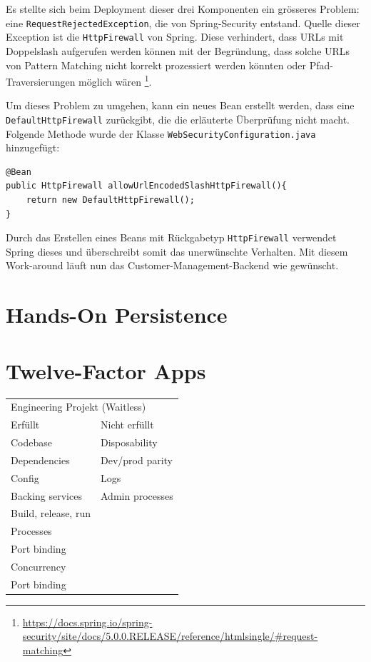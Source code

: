 \documentclass[12pt,a4paper]{article}
\begin{document}
Es stellte sich beim Deployment dieser drei Komponenten ein grösseres Problem: eine \texttt{RequestRejectedException}, die von Spring-Security entstand. Quelle dieser Exception ist die \texttt{HttpFirewall} von Spring. Diese verhindert, dass URLs mit Doppelslash aufgerufen werden können mit der Begründung, dass solche URLs von Pattern Matching nicht korrekt prozessiert werden könnten oder Pfad-Traversierungen möglich wären \footnote{\url{https://docs.spring.io/spring-security/site/docs/5.0.0.RELEASE/reference/htmlsingle/\#request-matching}}. 

Um dieses Problem zu umgehen, kann ein neues Bean erstellt werden, dass eine \texttt{DefaultHttpFirewall} zurückgibt, die die erläuterte Überprüfung nicht macht. Folgende Methode wurde der Klasse \texttt{Web\-Security\-Configuration.java} hinzugefügt:

\begin{lstlisting}
@Bean
public HttpFirewall allowUrlEncodedSlashHttpFirewall(){
	return new DefaultHttpFirewall();
}
\end{lstlisting}
Durch das Erstellen eines Beans mit Rückgabetyp \texttt{HttpFirewall} verwendet Spring dieses und überschreibt somit das unerwünschte Verhalten. Mit diesem Work-around läuft nun das Customer-Management-Backend wie gewünscht.

\section{Hands-On Persistence}


\section{Twelve-Factor Apps}
    \begin{table}[h]
        \begin{tabular}{ll}
        \multicolumn{2}{l}{Engineering Projekt (Waitless)} \\
        Erfüllt               & Nicht erfüllt              \\
        Codebase              & Disposability              \\
        Dependencies          & Dev/prod parity            \\
        Config                & Logs                       \\
        Backing services      & Admin processes            \\
        Build, release, run   &                            \\
        Processes             &                            \\
        Port binding          &                            \\
        Concurrency           &                            \\
        Port binding          &                            \\
        \end{tabular}
    \end{table}
\end{document}

